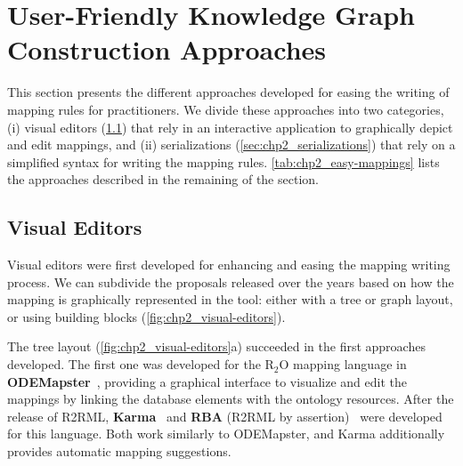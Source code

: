 \section{User-Friendly Knowledge Graph Construction Approaches}
\label{sec:chp2_easy_kgc}
 
This section presents the different approaches developed for easing the writing of mapping rules for practitioners. We divide these approaches into two categories, (i) visual editors (\cref{sec:chp2_visual-editors}) that rely in an interactive application to graphically depict and edit mappings, and (ii) serializations (\cref{sec:chp2_serializations}) that rely on a simplified syntax for writing the mapping rules. \cref{tab:chp2_easy-mappings} lists the approaches described in the remaining of the section.



\subsection{Visual Editors}
\label{sec:chp2_visual-editors}

Visual editors were first developed for enhancing and easing the mapping writing process. We can subdivide the proposals released over the years based on how the mapping is graphically represented in the tool: either with a tree or graph layout, or using building blocks (\cref{fig:chp2_visual-editors}).


The tree layout (\cref{fig:chp2_visual-editors}a) succeeded in the first approaches developed. 
The first one was developed for the R$_2$O mapping language in \textbf{ODEMapster}~\parencite{barrasa2006odemapster}, providing a graphical interface to visualize and edit the mappings by linking the database elements with the ontology resources. 
After the release of R2RML, \textbf{Karma}~\parencite{gupta2012karma} and \textbf{RBA} (R2RML by assertion)~\parencite{neto2013rba} were developed for this language. Both work similarly to ODEMapster, and Karma additionally provides automatic mapping suggestions. 

